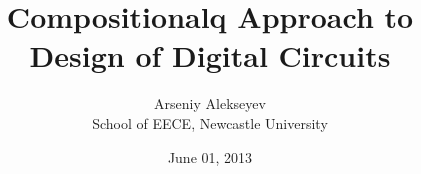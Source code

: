 \documentclass[12pt,english,british]{report}
\begin{document}
\title{Compositionalq Approach to Design of Digital Circuits}

\date{June 01, 2013}

\newcommand{\EECE}{School of EECE, Newcastle University}

\author{Arseniy Alekseyev\\ \EECE}

\maketitle

\setcounter{page}{1}

\tableofcontents
\newpage

\setcounter{page}{1}






\end{document}
